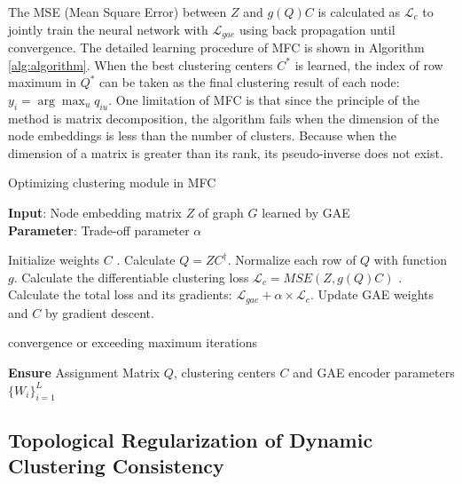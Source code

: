 \documentclass[letterpaper]{article} %
\begin{document}
The MSE (Mean Square Error) between $Z$ and $g(Q)C$ is calculated as $\mathcal{L}_{c}$ to jointly train the neural network with $\mathcal{L}_{gae}$ using back propagation until convergence. The detailed
learning procedure of MFC is shown in Algorithm \ref{alg:algorithm}. When the best clustering centers $C^*$ is learned, the index of row maximum in $Q^*$ can be taken as the final clustering result of each node: $y_i = \arg \max_u q_{iu}$. One limitation of MFC is that since the principle of the method is matrix decomposition, the algorithm fails when the dimension of the node embeddings is less than the number of clusters. Because when the dimension of a matrix is greater than its rank, its pseudo-inverse does not exist. 

\begin{algorithm}[tb]
    \caption{Optimizing clustering module in MFC}
    \label{alg:algorithm}
    \textbf{Input}: Node embedding matrix $Z$ of graph $G$ learned by GAE\\
    \textbf{Parameter}: Trade-off parameter $\alpha$\\
    \begin{algorithmic}[1] %
        \STATE Initialize weights $C$ .
        \REPEAT
        	\STATE Calculate $Q=ZC^{\dagger}$.
            \STATE Normalize each row of $Q$ with function $g$.
            \STATE Calculate the differentiable clustering loss $\mathcal{L}_{c}=MSE(Z, g(Q)C)$ .
            \STATE Calculate the total loss and its gradients: $\mathcal{L}_{gae} + \alpha \times \mathcal{L}_{c}$.
            \STATE Update GAE weights and $C$ by gradient descent.
        
        \UNTIL convergence or exceeding maximum iterations

        \STATE \textbf{Ensure} Assignment Matrix $Q$, clustering centers $C$  and GAE encoder parameters $\{W_i\}_{i=1}^L$
    \end{algorithmic}
\end{algorithm}



\subsection{Topological Regularization of Dynamic Clustering Consistency}
\end{document}
